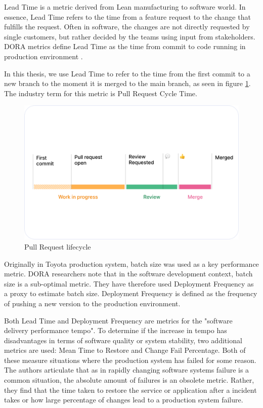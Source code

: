 Lead Time is a metric derived from Lean manufacturing to software world. In essence, Lead Time refers to the time from a feature request to the change that fulfills the request. Often in software, the changes are not directly requested by single customers, but rather decided by the teams using input from stakeholders. DORA metrics define Lead Time as the time from commit to code running in production environment \cite{forsgren_accelerate_2018}.

In this thesis, we use Lead Time to refer to the time from the first commit to a new branch to the moment it is merged to the main branch, as seen in figure \ref{fig:CycleTime}. The industry term for this metric is Pull Request Cycle Time. 

\begin{figure}[ht]
    \begin{center}
        \includegraphics[width=13.5cm]{images/cycletime_defined}
        \caption{Pull Request lifecycle \cite{swarmia_reducing_nodate}}
        \label{fig:CycleTime}
    \end{center}
\end{figure}

Originally in Toyota production system, batch size was used as a key performance metric. DORA researchers note that in the software development context, batch size is a sub-optimal metric. They have therefore used Deployment Frequency as a proxy to estimate batch size. Deployment Frequency is defined as the frequency of pushing a new version to the production environment.  

Both Lead Time and Deployment Frequency are metrics for the "software delivery performance tempo". To determine if the increase in tempo has disadvantages in terms of software quality or system stability, two additional metrics are used: Mean Time to Restore and Change Fail Percentage. Both of these measure situations where the production system has failed for some reason. The authors articulate that as in rapidly changing software systems failure is a common situation, the absolute amount of failures is an obsolete metric. Rather, they find that the time taken to restore the service or application after a incident takes or how large percentage of changes lead to a production system failure. 

